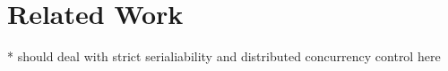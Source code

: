 \section{Related Work}
\label{sec:related}

* should deal with strict serialiability and distributed concurrency control here\\
